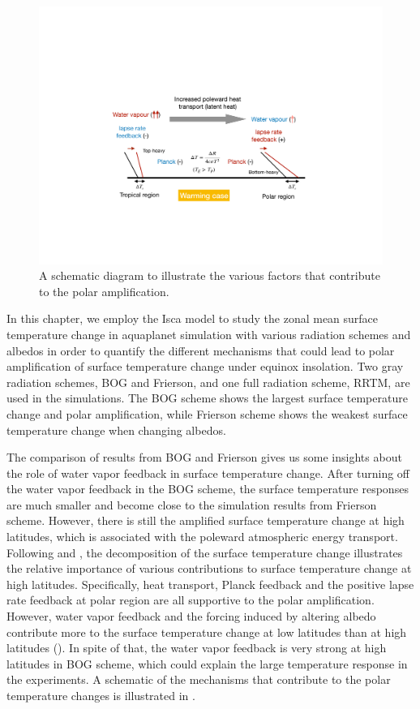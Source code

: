  \begin{figure}
	\includegraphics[width=1\textwidth]{figs/polar_amp/pa_dynamic.pdf}
	\caption{A schematic diagram to illustrate the various factors that contribute to the polar amplification.}
	\label{fig:pa_mechanism_schematic}
\end{figure}

In this chapter, we employ the Isca model to study the zonal mean surface temperature change in aquaplanet simulation with various radiation schemes and albedos in order to quantify the different mechanisms that could lead to polar amplification of surface temperature change under equinox insolation. Two gray radiation schemes, BOG and Frierson, and one full radiation scheme, RRTM, are used in the simulations. The BOG scheme shows the largest surface temperature change and polar amplification, while Frierson scheme shows the weakest surface temperature change when changing albedos. %

The comparison of results from BOG and Frierson gives us some insights about the role of water vapor feedback in surface temperature change. After turning off the water vapor feedback in the BOG scheme, the surface temperature responses are much smaller and become close to the simulation results from Frierson scheme. However, there is still the amplified surface temperature change at high latitudes, which is associated with the poleward atmospheric energy transport. Following \cite{Feldl2013} and \cite{Kim2018}, the decomposition of the surface temperature change illustrates the relative importance of various contributions to surface temperature change at high latitudes. Specifically, heat transport, Planck feedback and the positive lapse rate feedback at polar region are all supportive to the polar amplification. However, water vapor feedback and the forcing induced by altering albedo contribute more to the surface temperature change at low latitudes than at high latitudes (). In spite of that, the water vapor feedback is very strong at high latitudes in BOG scheme, which could explain the large temperature response in the experiments. A schematic of the mechanisms that contribute to the polar temperature changes is illustrated in .

